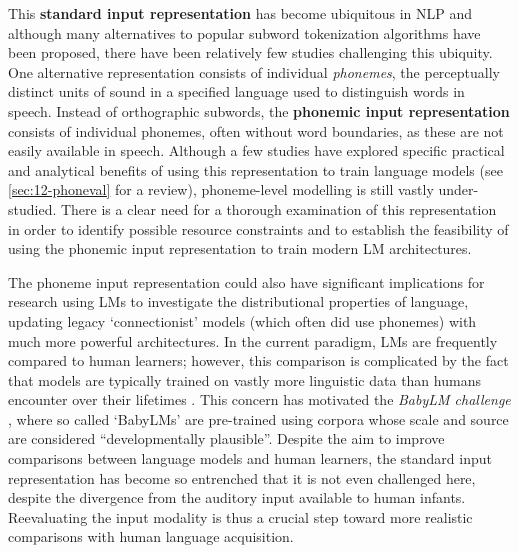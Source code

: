 This \textbf{standard input representation} has become ubiquitous in NLP and although many alternatives to popular subword tokenization algorithms have been proposed, there have been relatively few studies challenging this ubiquity. One alternative representation consists of individual \emph{phonemes}, the perceptually distinct units of sound in a specified language used to distinguish words in speech. Instead of orthographic subwords, the \textbf{phonemic input representation} consists of individual phonemes, often without word boundaries, as these are not easily available in speech. Although a few studies have explored specific practical and analytical benefits of using this representation to train language models (see \cref{sec:12-phoneval} for a review), phoneme-level modelling is still vastly under-studied. There is a clear need for a thorough examination of this representation in order to identify possible resource constraints %
and to establish the feasibility of using the phonemic input representation to train modern LM architectures.%


The phoneme input representation could also have significant implications for research using LMs to investigate the distributional properties of language, updating legacy `connectionist' models (which often did use phonemes) with much more powerful architectures. In the current paradigm, LMs are frequently compared to human learners; however, this comparison is complicated by the fact that models are typically trained on vastly more linguistic data than humans encounter over their lifetimes \citep{huebner-etal-2021-babyberta}. This concern has motivated the \emph{BabyLM challenge} \citep{warstadt-2023-babylm-findings,conll-2024-babylm}, where so called `BabyLMs' are pre-trained using corpora whose scale and source are considered ``developmentally plausible''. Despite the aim to improve comparisons between language models and human learners, the standard input representation has become so entrenched that it is not even challenged here, despite the divergence from the auditory input available to human infants. Reevaluating the input modality is thus a crucial step toward more realistic comparisons with human language acquisition.

